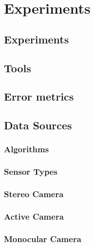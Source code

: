 \makeatletter
\chapter{Experiments}
\label{ch:Experiments}

\section{Experiments}


\section{Tools}
\label{ToolsSection}


\section{Error metrics}
\label{metricsSection}


\section{Data Sources}
\label{Sec:FVRSOTA}
\subsection{Algorithms} 
\label{AlgorithmsSection}


\subsection{Sensor Types} 
\label{SensorTypesExpsSection}


\subsection{Stereo Camera}
\label{StereoSOTA}


\subsection{Active Camera}
\label{ActiveSOTA}


\subsection{Monocular Camera}
\label{Sec:MonocularSOTA}


